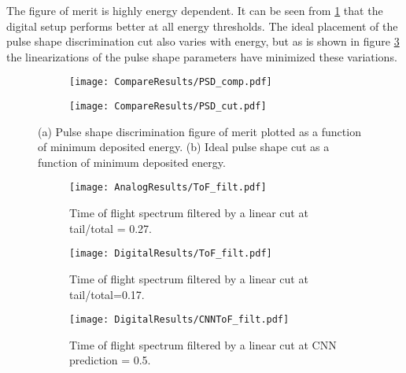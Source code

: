 \documentclass[main.tex]{subfiles}
\begin{document}
The figure of merit is highly energy dependent. It can be seen from \ref{fig:psd_fom_trend} that the digital setup performs better at all energy thresholds. The ideal placement of the pulse shape discrimination cut also varies with energy, but as is shown in figure \ref{fig:psd_cut_trend} the linearizations of the pulse shape parameters have minimized these variations.
\begin{figure}[ht]
	\begin{subfigure}[b]{\textwidth}
	    \centering
    	\texttt{[image: CompareResults/PSD\_comp.pdf]}
        \caption{}
	    \label{fig:psd_fom_trend} 
	\end{subfigure}
	\begin{subfigure}[b]{\textwidth}
    	\centering
        \texttt{[image: CompareResults/PSD\_cut.pdf]}
        \caption{}
    	\label{fig:psd_cut_trend} 
    \end{subfigure}
    \caption{(a) Pulse shape discrimination figure of merit plotted as a function of minimum deposited energy. (b) Ideal pulse shape cut as a function of minimum deposited energy.}
\end{figure}

\begin{figure}
    \centering
    \begin{subfigure}[bh]{\textwidth}
   	   	\centering
	    \texttt{[image: AnalogResults/ToF\_filt.pdf]}
        \label{fig:ToF_filt_A}
    	\caption{Time of flight spectrum filtered by a linear cut at tail/total = 0.27.}
    	\label{fig:tof_cc_cnn}
   	\end{subfigure}
    \begin{subfigure}[bh]{\textwidth}
   	    \centering
        \texttt{[image: DigitalResults/ToF\_filt.pdf]}
        \caption{Time of flight spectrum filtered by a linear cut at tail/total=0.17.}
        \label{fig:ToF_filt_D}
    \end{subfigure}
	\begin{subfigure}[bh]{\textwidth}
	    \centering
        \texttt{[image: DigitalResults/CNNToF\_filt.pdf]}
        \caption{Time of flight spectrum filtered by a linear cut at CNN prediction = 0.5.}
        \label{fig:ToF_filt_D_CNN}
    \end{subfigure}
	
	\caption{}
    \label{fig:tof_cc_cnn}
\end{figure}
\end{document}
